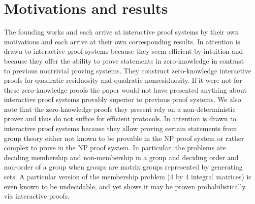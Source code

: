 \section{Motivations and results}

The founding works \cite{GMR85} and \cite{Bab85} each arrive at interactive proof systems by their own motivations and each arrive at their own corresponding results.
In \cite{GMR85} attention is drawn to interactive proof systems because they seem efficient by intuition and because they offer the ability to prove statements in zero-knowledge in contrast to previous nontrivial proving systems.
They construct zero-knowledge interactive proofs for quadratic residuosity and quadratic nonresiduosity.
If it were not for these zero-knowledge proofs the paper would not have presented anything about interactive proof systems provably superior to previous proof systems.
We also note that the zero-knowledge proofs they present rely on a non-deterministic prover and thus do not suffice for efficient protocols.
In \cite{Bab85} attention is drawn to interactive proof systems because they allow proving certain statements from group theory either not known to be provable in the NP proof system or rather complex to prove in the NP proof system.
In particular, the problems are deciding membership and non-membership in a group and deciding order and non-order of a group when groups are matrix groups represented by generating sets.
A particular version of the membership problem (4 by 4 integral matrices) is even known to be undecidable, and yet \cite{Bab85} shows it may be proven probabilistically via interactive proofs.

